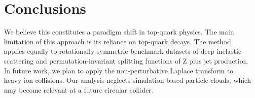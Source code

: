 \section{Conclusions}\label{sec:conclusions}

We believe this constitutes a paradigm shift in top-quark physics. The
main limitation of this approach is its reliance on top-quark decays.
The method applies equally to rotationally symmetric benchmark datasets
of deep inelastic scattering and permutation-invariant splitting
functions of Z plus jet production. In future work, we plan to apply the
non-perturbative Laplace transform to heavy-ion collisions. Our analysis
neglects simulation-based particle clouds, which may become relevant at
a future circular collider.

